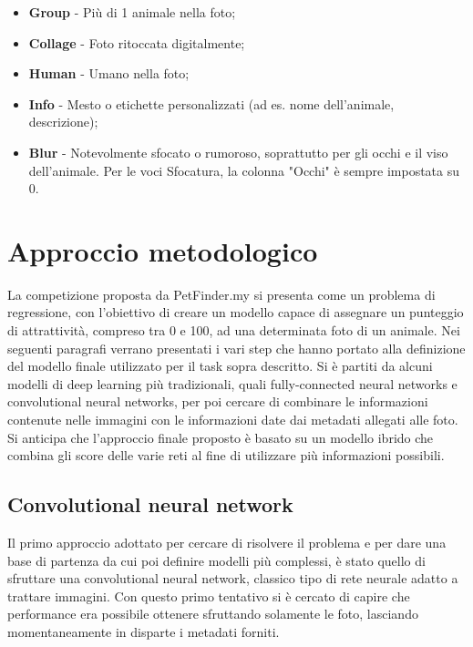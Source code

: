 \begin{itemize}
        \item \textbf{Group} - Più di 1 animale nella foto;
        \item \textbf{Collage} - Foto ritoccata digitalmente;
        \item \textbf{Human} - Umano nella foto;
        \item \textbf{Info} - Mesto o etichette personalizzati (ad es. nome dell'animale, descrizione);
        \item \textbf{Blur} - Notevolmente sfocato o rumoroso, soprattutto per gli occhi e il viso dell'animale. Per le voci Sfocatura, la colonna "Occhi" è sempre impostata su 0.
    \end{itemize}
    

\section{Approccio metodologico}

    La competizione proposta da PetFinder.my si presenta come un problema di regressione, con l'obiettivo di creare un modello capace di assegnare un punteggio di attrattività, 
    compreso tra 0 e 100, ad una determinata foto di un animale.
    Nei seguenti paragrafi verrano presentati i vari step che hanno portato alla definizione del modello finale utilizzato per il task sopra descritto.
    Si è partiti da alcuni modelli di deep learning più tradizionali, quali fully-connected neural networks e convolutional neural networks, per poi cercare di combinare le informazioni
    contenute nelle immagini con le informazioni date dai metadati allegati alle foto.
    Si anticipa che l'approccio finale proposto è basato su un modello ibrido che combina gli score delle varie reti al fine di utilizzare più informazioni possibili.

    \subsection{Convolutional neural network}
    \label{cnn}
        Il primo approccio adottato per cercare di risolvere il problema e per dare una base di partenza da cui poi definire modelli più complessi, è stato quello di sfruttare
        una convolutional neural network, classico tipo di rete neurale adatto a trattare immagini. Con questo primo tentativo si è cercato di capire che performance era possibile
        ottenere sfruttando solamente le foto, lasciando momentaneamente in disparte i metadati forniti.

